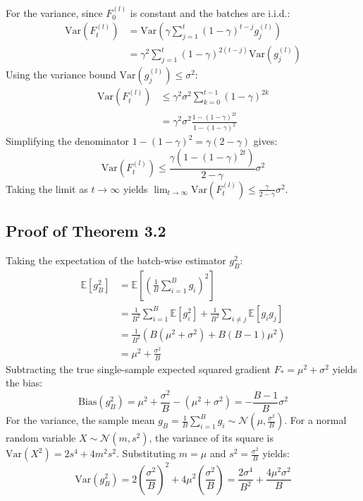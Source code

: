 \documentclass{article}
\theoremstyle{plain}
\theoremstyle{definition}
\begin{document}
For the variance, since $F_0^{(l)}$ is constant and the batches are i.i.d.:
\begin{align}
    \text{Var}(F_t^{(l)}) &= \text{Var}\left( \gamma \sum_{j=1}^t (1 - \gamma)^{t-j} g_j^{(l)} \right) \\
    &= \gamma^2 \sum_{j=1}^t (1 - \gamma)^{2(t-j)} \text{Var}(g_j^{(l)})
\end{align}
Using the variance bound $\text{Var}(g_j^{(l)}) \leq \sigma^2$:
\begin{align}
    \text{Var}(F_t^{(l)}) &\leq \gamma^2 \sigma^2 \sum_{k=0}^{t-1} (1 - \gamma)^{2k} \\
    &= \gamma^2 \sigma^2 \frac{1 - (1 - \gamma)^{2t}}{1 - (1 - \gamma)^2}
\end{align}
Simplifying the denominator $1 - (1 - \gamma)^2 = \gamma(2 - \gamma)$ gives:
\begin{equation}
    \text{Var}(F_t^{(l)}) \leq \frac{\gamma (1 - (1 - \gamma)^{2t})}{2 - \gamma} \sigma^2
\end{equation}
Taking the limit as $t \to \infty$ yields $\lim_{t \to \infty} \text{Var}(F_t^{(l)}) \leq \frac{\gamma}{2 - \gamma} \sigma^2$.

\subsection{Proof of Theorem 3.2}
\label{appendix-proof-thm2}
Taking the expectation of the batch-wise estimator $g_B^2$:
\begin{align}
    \mathbb{E}[g_B^2] &= \mathbb{E}\left[ \left( \frac{1}{B} \sum_{i=1}^B g_i \right)^2 \right] \\
    &= \frac{1}{B^2} \sum_{i=1}^B \mathbb{E}[g_i^2] + \frac{1}{B^2} \sum_{i \neq j} \mathbb{E}[g_i g_j] \\
    &= \frac{1}{B^2} \left( B (\mu^2 + \sigma^2) + B(B-1) \mu^2 \right) \\
    &= \mu^2 + \frac{\sigma^2}{B}
\end{align}
Subtracting the true single-sample expected squared gradient $F_* = \mu^2 + \sigma^2$ yields the bias:
\begin{equation}
    \text{Bias}(g_B^2) = \mu^2 + \frac{\sigma^2}{B} - (\mu^2 + \sigma^2) = - \frac{B-1}{B} \sigma^2
\end{equation}
For the variance, the sample mean $g_B = \frac{1}{B}\sum_{i=1}^B g_i \sim \mathcal{N}(\mu, \frac{\sigma^2}{B})$. For a normal random variable $X \sim \mathcal{N}(m, s^2)$, the variance of its square is $\text{Var}(X^2) = 2 s^4 + 4 m^2 s^2$. Substituting $m = \mu$ and $s^2 = \frac{\sigma^2}{B}$ yields:
\begin{equation}
    \text{Var}(g_B^2) = 2 \left( \frac{\sigma^2}{B} \right)^2 + 4 \mu^2 \left( \frac{\sigma^2}{B} \right) = \frac{2 \sigma^4}{B^2} + \frac{4 \mu^2 \sigma^2}{B}
\end{equation}
\end{document}

